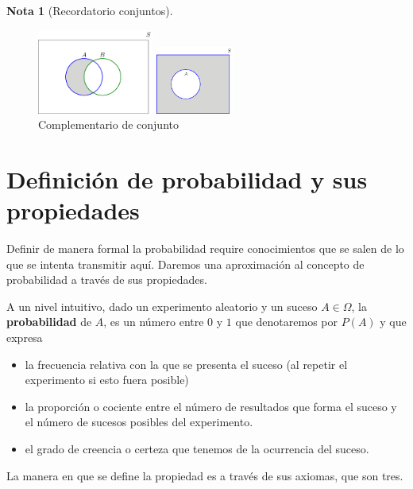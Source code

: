 \documentclass[]{book}
\theoremstyle{plain}
\theoremstyle{definition}
\newtheorem{note}[theorem]{Nota}
\begin{document}
\begin{note}[Recordatorio conjuntos]
\begin{figure}[htbp]
      \begin{minipage}{0.5\linewidth}
      \centering
      \includegraphics[width=1.5in,height=\textheight]{img/difference_b.png}
      \caption{Resta de conjuntos}
      \end{minipage}%
      \begin{minipage}{0.5\linewidth}
      \centering
      \includegraphics[width=1in,height=\textheight]{img/complement_b.png}
      \caption{Complementario de conjunto}
      \end{minipage}
    \end{figure} 
\end{note}


\newpage
\section{Definición de probabilidad y sus propiedades}

Definir de manera formal la probabilidad require conocimientos que se salen de lo que se intenta transmitir aquí. Daremos una aproximación
al concepto de probabilidad a través de sus propiedades.

A un nivel intuitivo, dado un experimento aleatorio y un suceso $A\in \Omega$, la \textbf{probabilidad} de $A$,
es un número entre $0$ y $1$ que denotaremos por $P(A)$ y que expresa 
\begin{itemize}
  \item la frecuencia relativa con la que se presenta el suceso (al repetir el experimento si esto fuera posible)
  \item la proporción o cociente entre el número de resultados que forma el suceso y el número de sucesos posibles del experimento.
  \item el grado de creencia o certeza que tenemos de la ocurrencia del suceso.
\end{itemize}

La manera en que se define la propiedad es a través de sus axiomas, que son tres. 
\end{document}

